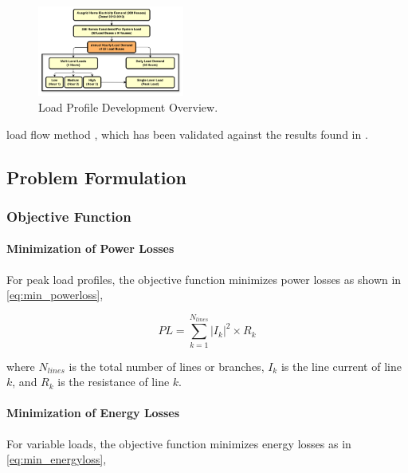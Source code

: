 \documentclass[conference]{IEEEtran}
\begin{document}
\begin{figure}[htbp]
	\centerline{\includegraphics[width=0.43\textwidth]{loadprofileoverview.png}}
	\vspace{-10pt}
	\caption{Load Profile Development Overview.}
	\vspace{-10pt}
	\label{fig:loadprofileoverview}
\end{figure}

\noindent load flow method \cite{BFS}, which has been validated against the results found in \cite{Bouchekara}. 



\subsection{Problem Formulation}
\subsubsection{Objective Function}

\paragraph{Minimization of Power Losses}
For peak load profiles, the objective function minimizes power losses as shown in \eqref{eq:min_powerloss},

\begin{equation}
	PL=\sum_{k=1}^{N_{lines}} \left|I_{k}\right|^{2} \times R_{k}
	\label{eq:min_powerloss}
\end{equation}

where $N_{lines}$ is the total number of lines or branches, $I_k$ is the line current of line $k$, and $R_k$ is the resistance of line $k$.

\paragraph{Minimization of Energy Losses}
For variable loads, the objective function minimizes energy losses as in \eqref{eq:min_energyloss},
\end{document}
